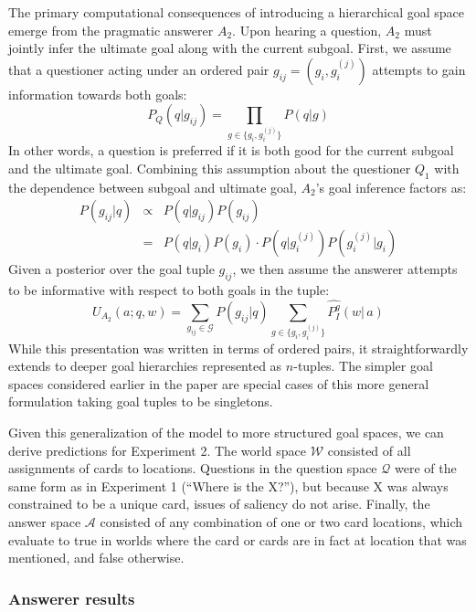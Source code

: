 \documentclass[12pt, floatsintext, jou]{apa6}
\begin{document}
The primary computational consequences of introducing a hierarchical goal space emerge from the pragmatic answerer $A_2$. 
Upon hearing a question, $A_2$ must jointly infer the ultimate goal along with the current subgoal.
First, we assume that a questioner acting under an ordered pair $g_{ij} = (g_i, g_i^{(j)})$ attempts to gain information towards both goals:
$$P_{Q}(q | g_{ij}) = \prod_{g\in \{g_i, g_i^{(j)}\}} P(q | g)$$
In other words, a question is preferred if it is both good for the current subgoal and the ultimate goal.
Combining this assumption about the questioner $Q_1$ with the dependence between subgoal and ultimate goal, $A_2$'s goal inference factors as:
$$\begin{array}{rcl}
P(g_{ij} | q) & \propto & P(q | g_{ij})P(g_{ij}) \\
 & = & P(q | g_i)P(g_i) \cdot P(q | g_i^{(j)}) P(g_i^{(j)} | g_i)
 \end{array}$$
Given a posterior over the goal tuple $g_{ij}$, we then assume the answerer attempts to be informative with respect to both goals in the tuple: 
$$U_{A_2}(a; q, w) = \sum_{g_{ij} \in \mathcal{G}} P(g_{ij}|q) \sum_{g\in \{g_i, g_i^{(j)}\}}\widehat{P^g_I}(w|\,a)$$
While this presentation was written in terms of ordered pairs, it straightforwardly extends to deeper goal hierarchies represented as $n$-tuples. 
The simpler goal spaces considered earlier in the paper are special cases of this more general formulation taking goal tuples to be singletons.

Given this generalization of the model to more structured goal spaces, we can derive predictions for Experiment 2. 
The world space $\mathcal{W}$ consisted of all assignments of cards to locations.
Questions in the question space $\mathcal{Q}$ were of the same form as in Experiment 1 (``Where is the X?''), but because X was always constrained to be a unique card, issues of saliency do not arise. 
Finally, the answer space $\mathcal{A}$ consisted of any combination of one or two card locations, which evaluate to true in worlds where the card or cards are in fact at location that was mentioned, and false otherwise.


\subsubsection{Answerer results}
\end{document}

